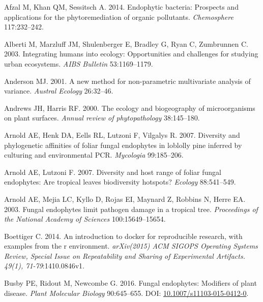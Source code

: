 \documentclass[fleqn,10pt,lineno]{wlpeerj} %
\newlength{\cslhangindent}
\newenvironment{CSLReferences}[2] %
 {%
  \setlength{\parindent}{0pt}
  \ifodd #1 \everypar{\setlength{\hangindent}{\cslhangindent}}\ignorespaces\fi
  \ifnum #2 > 0
  \setlength{\parskip}{#2\baselineskip}
  \fi
 }%
 {}
\begin{document}
\hypertarget{refs}{}
\begin{CSLReferences}{1}{0}
\leavevmode{}%
Afzal M, Khan QM, Sessitsch A. 2014. Endophytic bacteria: Prospects and applications for the phytoremediation of organic pollutants. \emph{Chemosphere} 117:232--242.

\leavevmode{}%
Alberti M, Marzluff JM, Shulenberger E, Bradley G, Ryan C, Zumbrunnen C. 2003. Integrating humans into ecology: Opportunities and challenges for studying urban ecosystems. \emph{AIBS Bulletin} 53:1169--1179.

\leavevmode{}%
Anderson MJ. 2001. A new method for non-parametric multivariate analysis of variance. \emph{Austral Ecology} 26:32--46.

\leavevmode{}%
Andrews JH, Harris RF. 2000. The ecology and biogeography of microorganisms on plant surfaces. \emph{Annual review of phytopathology} 38:145--180.

\leavevmode{}%
Arnold AE, Henk DA, Eells RL, Lutzoni F, Vilgalys R. 2007. Diversity and phylogenetic affinities of foliar fungal endophytes in loblolly pine inferred by culturing and environmental {PCR}. \emph{Mycologia} 99:185--206.

\leavevmode{}%
Arnold AE, Lutzoni F. 2007. Diversity and host range of foliar fungal endophytes: Are tropical leaves biodiversity hotspots? \emph{Ecology} 88:541--549.

\leavevmode{}%
Arnold AE, Mejia LC, Kyllo D, Rojas EI, Maynard Z, Robbins N, Herre EA. 2003. Fungal endophytes limit pathogen damage in a tropical tree. \emph{Proceedings of the National Academy of Sciences} 100:15649--15654.

\leavevmode{}%
Boettiger C. 2014. An introduction to docker for reproducible research, with examples from the r environment. \emph{arXiv(2015) ACM SIGOPS Operating Systems Review, Special Issue on Repeatability and Sharing of Experimental Artifacts. 49(1), 71-79}:1410.0846v1.

\leavevmode{}%
Busby PE, Ridout M, Newcombe G. 2016. Fungal endophytes: Modifiers of plant disease. \emph{Plant Molecular Biology} 90:645--655. DOI: \href{https://doi.org/10.1007/s11103-015-0412-0}{10.1007/s11103-015-0412-0}.


\end{CSLReferences}
\end{document}
